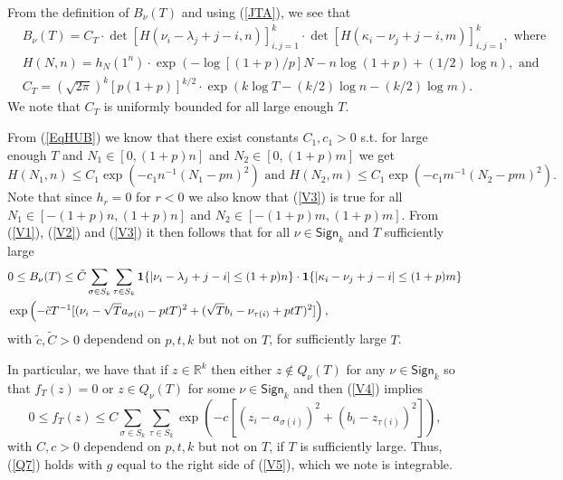 From the definition of $B_\nu(T)$ and using (\ref{JTA}), we see that
\begin{equation}\label{V2}
\begin{split}
&B_\nu(T)  = C_T \cdot \det \left[ H(\nu_i - \lambda_j + j - i, n)  \right]_{i,j = 1}^k \cdot \det \left[ H(\kappa_i - \nu_j + j - i, m) \right]_{i,j = 1}^k, \mbox{ where }\\
&H(N,n) = h_N(1^n) \cdot \exp \left(- \log [(1+p) /p]N - n \log (1+p) + (1/2) \log n \right), \mbox{ and } \\
&C_T = (\sqrt{2\pi})^{k} [p(1+p)]^{k/2} \cdot \exp \left( k \log T - (k/2) \log n - (k/2) \log m  \right).
\end{split}
\end{equation}
We note that $C_T$ is uniformly bounded for all large enough $T$.

From (\ref{EqHUB}) we know that there exist constants $C_1, c_1 > 0$ s.t. for large enough $T$ and $N_1 \in [0, (1+p)n]$ and $N_2 \in [0, (1+p)m]$ we get
\begin{equation}\label{V3}
H(N_1,n) \leq C_1 \exp\left( - c_1n^{-1}(N_1-pn)^2 \right) \mbox{ and }H(N_2,m) \leq C_1 \exp\left( - c_1m^{-1}(N_2-pm)^2 \right).
\end{equation}
Note that since $h_r = 0$ for $r<0$ we also know that (\ref{V3}) is true for all $N_1 \in [-(1+p)n, (1+p)n]$
and $N_2 \in [-(1+p)m, (1+p)m]$. From (\ref{V1}), (\ref{V2}) and (\ref{V3}) it then follows that for all $\nu \in \mathsf{Sign}_k$ and $T$ sufficiently large
\begin{equation}\label{V4}
\begin{split}
&0 \leq B_\nu(T) \leq \tilde{C} \sum_{\sigma \in S_k} \sum_{\tau \in S_k} {\bf 1} \{|\nu_i - \lambda_j + j - i| \leq (1+p)n \} \cdot   {\bf 1} \{ |\kappa_i - \nu_j +j - i| \leq (1+p)m \}   \\
&\exp\left( - \tilde{c} T^{-1}[ (\nu_i - \sqrt{T}a_{\sigma(i)} -ptT)^2 + (\sqrt{T}b_i - \nu_{\tau(i)}+ ptT)^2]  \right),
\end{split}
\end{equation}
with $\tilde{c}, \tilde{C} > 0$ dependend on $p, t, k$ but not on $T$, for sufficiently large $T$.

In particular, we have that if $z \in \mathbb{R}^k$ then either $z \not \in Q_\nu(T)$ for any $\nu \in \mathsf{Sign}_k$ so that $f_T(z) = 0$ or $z \in Q_\nu(T)$ for some $\nu \in \mathsf{Sign}_k$ and then 
(\ref{V4}) implies 
\begin{equation}\label{V5}
0 \leq f_T(z) \leq C \sum_{\sigma \in S_k} \sum_{\tau \in S_k}  \exp\left( - c[ (z_i - a_{\sigma(i)})^2 + (b_i - z_{\tau(i)})^2]  \right),
\end{equation}
with $C, c > 0$ dependend on $p, t, k$ but not on $T$, if $T$ is sufficiently large. Thus, (\ref{Q7}) holds with $g$ equal to the right side of (\ref{V5}), which we note is integrable.

